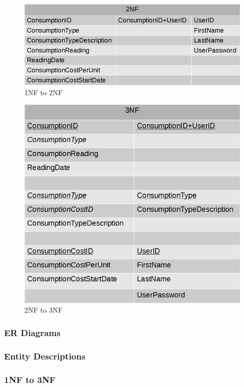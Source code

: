 \begin{figure}[H]
\includegraphics{./design/2NF.png}
\caption{1NF to 2NF}
\end{figure}

\begin{figure}[H]
\includegraphics{./design/3NF.png}
\caption{2NF to 3NF}
\end{figure}

\subsubsection{ER Diagrams}

\subsubsection{Entity Descriptions}

\subsubsection{1NF to 3NF}


